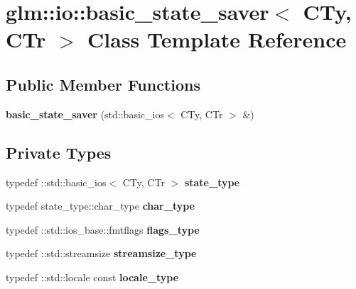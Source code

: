 \hypertarget{classglm_1_1io_1_1basic__state__saver}{}\section{glm\+:\+:io\+:\+:basic\+\_\+state\+\_\+saver$<$ C\+Ty, C\+Tr $>$ Class Template Reference}
\label{classglm_1_1io_1_1basic__state__saver}
\subsection*{Public Member Functions}
\begin{DoxyCompactItemize}
\item 
{\bfseries basic\+\_\+state\+\_\+saver} (std\+::basic\+\_\+ios$<$ C\+Ty, C\+Tr $>$ \&)\hypertarget{classglm_1_1io_1_1basic__state__saver_ab31652b0b7f2a24fa8f9fda2505de356}{}\label{classglm_1_1io_1_1basic__state__saver_ab31652b0b7f2a24fa8f9fda2505de356}

\end{DoxyCompactItemize}
\subsection*{Private Types}
\begin{DoxyCompactItemize}
\item 
typedef \+::std\+::basic\+\_\+ios$<$ C\+Ty, C\+Tr $>$ {\bfseries state\+\_\+type}\hypertarget{classglm_1_1io_1_1basic__state__saver_a84787cc03192543bfe67ef25e7f20aa6}{}\label{classglm_1_1io_1_1basic__state__saver_a84787cc03192543bfe67ef25e7f20aa6}

\item 
typedef state\+\_\+type\+::char\+\_\+type {\bfseries char\+\_\+type}\hypertarget{classglm_1_1io_1_1basic__state__saver_ae6abb8e2e6bd4a044e953746691ffe8e}{}\label{classglm_1_1io_1_1basic__state__saver_ae6abb8e2e6bd4a044e953746691ffe8e}

\item 
typedef \+::std\+::ios\+\_\+base\+::fmtflags {\bfseries flags\+\_\+type}\hypertarget{classglm_1_1io_1_1basic__state__saver_a73ca8320543524c7ab7f1ce97d30aff6}{}\label{classglm_1_1io_1_1basic__state__saver_a73ca8320543524c7ab7f1ce97d30aff6}

\item 
typedef \+::std\+::streamsize {\bfseries streamsize\+\_\+type}\hypertarget{classglm_1_1io_1_1basic__state__saver_a0a4c44df9a4fcf7531af6da7698e0931}{}\label{classglm_1_1io_1_1basic__state__saver_a0a4c44df9a4fcf7531af6da7698e0931}

\item 
typedef \+::std\+::locale const {\bfseries locale\+\_\+type}\hypertarget{classglm_1_1io_1_1basic__state__saver_acc657f13df9c1fd68e1014b96ff615cb}{}\label{classglm_1_1io_1_1basic__state__saver_acc657f13df9c1fd68e1014b96ff615cb}

\end{DoxyCompactItemize}
